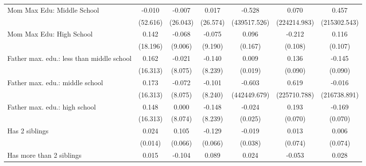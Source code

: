 {\begin{tabular}{l*{6}{c}}
\addlinespace
Mom Max Edu: Middle School&      -0.010         &      -0.007         &       0.017         &      -0.528         &       0.070         &       0.457         \\
                    &    (52.616)         &    (26.043)         &    (26.574)         &(439517.526)         &(224214.983)         &(215302.543)         \\
\addlinespace
Mom Max Edu: High School&       0.142         &      -0.068         &      -0.075         &       0.096         &      -0.212\sym{*}  &       0.116         \\
                    &    (18.196)         &     (9.006)         &     (9.190)         &     (0.167)         &     (0.108)         &     (0.107)         \\
\addlinespace
Father max. edu.: less than middle school&       0.162         &      -0.021         &      -0.140         &       0.009         &       0.136         &      -0.145         \\
                    &    (16.313)         &     (8.075)         &     (8.239)         &     (0.019)         &     (0.090)         &     (0.090)         \\
\addlinespace
Father max. edu.: middle school&       0.173         &      -0.072         &      -0.101         &      -0.603         &       0.619         &      -0.016         \\
                    &    (16.313)         &     (8.075)         &     (8.240)         &(442449.679)         &(225710.788)         &(216738.891)         \\
\addlinespace
Father max. edu.: high school&       0.148         &       0.000         &      -0.148         &      -0.024         &       0.193\sym{**} &      -0.169\sym{*}  \\
                    &    (16.313)         &     (8.074)         &     (8.239)         &     (0.025)         &     (0.070)         &     (0.070)         \\
\addlinespace
Has 2 siblings      &       0.024         &       0.105         &      -0.129         &      -0.019         &       0.013         &       0.006         \\
                    &     (0.014)         &     (0.066)         &     (0.066)         &     (0.038)         &     (0.074)         &     (0.074)         \\
\addlinespace
Has more than 2 siblings&       0.015         &      -0.104         &       0.089         &       0.024         &      -0.053         &       0.028         \\

\end{tabular}}
